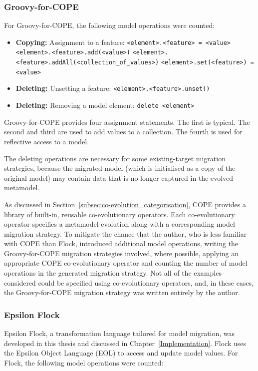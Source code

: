 \subsubsection{Groovy-for-COPE}
For Groovy-for-COPE, the following model operations were counted:

\begin{itemize}
	\item \textbf{Copying:} Assignment to a feature:
	\subitem \texttt{<element>.<feature> = <value>}
	\subitem \texttt{<element>.<feature>.add(<value>)}
	\subitem \texttt{<element>.<feature>.addAll(<collection\_of\_values>)}
	\subitem \texttt{<element>.set(<feature>) = <value>}
	
	\item \textbf{Deleting:} Unsetting a feature:
	\subitem \texttt{<element>.<feature>.unset()}	
	
	\item \textbf{Deleting:} Removing a model element:
	\subitem \texttt{delete <element>}
\end{itemize}

Groovy-for-COPE provides four assignment statements. The first is typical. The second and third are used to add values to a collection. The fourth is used for reflective access to a model.

The deleting operations are necessary for some existing-target migration strategies, because the migrated model (which is initialised as a copy of the original model) may contain data that is no longer captured in the evolved metamodel.

As discussed in Section~\ref{subsec:co-evolution_categorisation}, COPE provides a library of built-in, reusable co-evolutionary operators. Each co-evolutionary operator specifies a metamodel evolution along with a corresponding model migration strategy. To mitigate the chance that the author, who is less familiar with COPE than Flock, introduced additional model operations, writing the Groovy-for-COPE migration strategies involved, where possible, applying an appropriate COPE co-evolutionary operator and counting the number of model operations in the generated migration strategy. Not all of the examples considered could be specified using co-evolutionary operators, and, in these cases, the Groovy-for-COPE migration strategy was written entirely by the author.


\subsubsection{Epsilon Flock}
Epsilon Flock, a transformation language tailored for model migration, was developed in this thesis and discussed in Chapter~\ref{Implementation}. Flock uses the Epsilon Object Language (EOL) \cite{kolovos06eol} to access and update model values. For Flock, the following model operations were counted:


